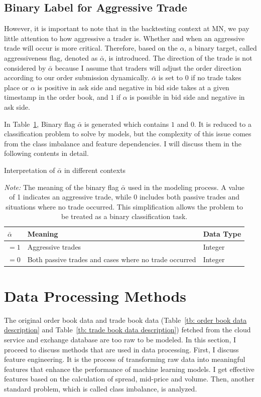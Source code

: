 \subsection{Binary Label for Aggressive Trade} \label{sec: aflag}
However, it is important to note that in the backtesting context at MN, we pay little attention to how aggressive a trader is. Whether and when an aggressive trade will occur is more critical. Therefore, based on the $\alpha$, a binary target, called aggressiveness flag, denoted as $\bar{\alpha}$, is introduced. The direction of the trade is not considered by $\bar{\alpha}$ because I assume that traders will adjust the order direction according to our order submission dynamically. $\bar{\alpha}$ is set to $0$ if no trade takes place or $\alpha$ is positive in ask side and negative in bid side takes at a given timestamp in the order book, and $1$ if $\alpha$ is possible in bid side and negative in ask side. 

In Table~\ref{tb: aflag_meaning}, Binary flag $\bar{\alpha}$ is generated which contains $1$ and $0$. It is reduced to a classification problem to solve by models, but the complexity of this issue comes from the class imbalance and feature dependencies. I will discuss them in the following contents in detail.
\begin{table}[tbp] 
    \centering 
    \caption{Interpretation of $\bar{\alpha}$ in different contexts}
    \caption*{\textit{Note:} The meaning of the binary flag $\bar{\alpha}$ used in the modeling process. A value of 1 indicates an aggressive trade, while 0 includes both passive trades and situations where no trade occurred. This simplification allows the problem to be treated as a binary classification task.}
    \begin{tabular}{lll} 
        \toprule 
        \textbf{$\bar{\alpha}$} & \textbf{Meaning} & \textbf{Data Type} \\ 
        \midrule 
        $ = 1$ & Aggressive trades & Integer \\
        $ = 0$ & Both passive trades and cases where no trade occurred & Integer \\  
        \bottomrule 
    \end{tabular} 
    \label{tb: aflag_meaning}
\end{table}


\section{Data Processing Methods}
The original order book data and trade book data (Table~\ref{tb: order book data description} and Table~\ref{tb: trade book data description}) fetched from the cloud service and exchange database are too raw to be modeled. In this section, I proceed to discuss methods that are used in data processing. First, I discuss feature engineering. It is the process of transforming raw data into meaningful features that enhance the performance of machine learning models. I get effective features based on the calculation of spread, mid-price and volume. Then, another standard problem, which is called class imbalance, is analyzed.

